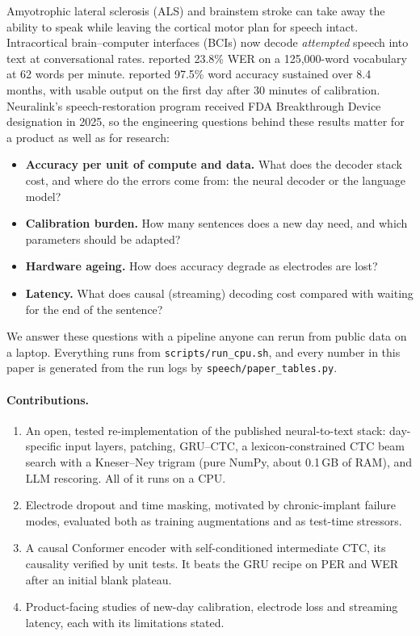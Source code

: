 Amyotrophic lateral sclerosis (ALS) and brainstem stroke can take away the ability to speak while leaving the cortical motor plan for speech intact. Intracortical brain--computer interfaces (BCIs) now decode \emph{attempted} speech into text at conversational rates. \citet{willett2023speech} reported 23.8\% WER on a 125{,}000-word vocabulary at 62 words per minute. \citet{card2024accurate} reported 97.5\% word accuracy sustained over 8.4 months, with usable output on the first day after 30 minutes of calibration. Neuralink's speech-restoration program received FDA Breakthrough Device designation in 2025, so the engineering questions behind these results matter for a product as well as for research:
\begin{itemize}\itemsep0pt
\item \textbf{Accuracy per unit of compute and data.} What does the decoder stack cost, and where do the errors come from: the neural decoder or the language model?
\item \textbf{Calibration burden.} How many sentences does a new day need, and which parameters should be adapted?
\item \textbf{Hardware ageing.} How does accuracy degrade as electrodes are lost?
\item \textbf{Latency.} What does causal (streaming) decoding cost compared with waiting for the end of the sentence?
\end{itemize}

We answer these questions with a pipeline anyone can rerun from public data on a laptop. Everything runs from \texttt{scripts/run\_cpu.sh}, and every number in this paper is generated from the run logs by \texttt{speech/paper\_tables.py}.

\paragraph{Contributions.}
\begin{enumerate}\itemsep0pt
\item An open, tested re-implementation of the published neural-to-text stack: day-specific input layers, patching, GRU--CTC, a lexicon-constrained CTC beam search with a Kneser--Ney trigram (pure NumPy, about 0.1\,GB of RAM), and LLM rescoring. All of it runs on a CPU.
\item Electrode dropout and time masking, motivated by chronic-implant failure modes, evaluated both as training augmentations and as test-time stressors.
\item A causal Conformer encoder with self-conditioned intermediate CTC, its causality verified by unit tests. It beats the GRU recipe on PER and WER after an initial blank plateau.
\item Product-facing studies of new-day calibration, electrode loss and streaming latency, each with its limitations stated.
\end{enumerate}

